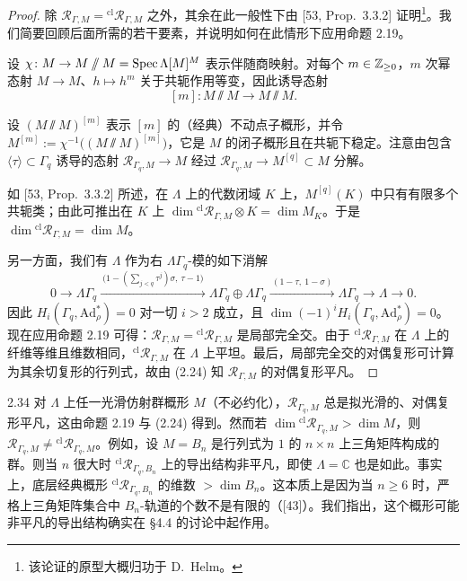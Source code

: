 \begin{proof}
除 $\mathcal R_{\Gamma,M} = {}^{\mathrm{cl}}\mathcal R_{\Gamma,M}$ 之外，其余在此一般性下由 [53, Prop.\ 3.3.2] 证明\footnote{该论证的原型大概归功于 D.\ Helm。}。我们简要回顾后面所需的若干要素，并说明如何在此情形下应用命题 2.19。

设 $\chi\colon M \to M\sslash M = \operatorname{Spec} \Lambda[M]^M$ 表示伴随商映射。对每个 $m \in \mathbb{Z}_{\ge 0}$，$m$ 次幂态射 $M \to M$、$h \mapsto h^m$ 关于共轭作用等变，因此诱导态射
\[
[m]\colon M\sslash M \to M\sslash M.
\]

设 $(M\sslash M)^{[m]}$ 表示 $[m]$ 的（经典）不动点子概形，并令 $M^{[m]} := \chi^{-1}\bigl((M\sslash M)^{[m]}\bigr)$，它是 $M$ 的闭子概形且在共轭下稳定。注意由包含 $\langle\tau\rangle \subset \Gamma_q$ 诱导的态射 $\mathcal R_{\Gamma_q,M} \to M$ 经过 $\mathcal R_{\Gamma_q,M} \to M^{[q]} \subset M$ 分解。

如 [53, Prop.\ 3.3.2] 所述，在 $\Lambda$ 上的代数闭域 $K$ 上，$M^{[q]}(K)$ 中只有有限多个共轭类；由此可推出在 $K$ 上 $\dim {}^{\mathrm{cl}}\mathcal R_{\Gamma,M}\otimes K = \dim M_K$。于是 $\dim {}^{\mathrm{cl}}\mathcal R_{\Gamma,M} = \dim M$。

另一方面，我们有 $\Lambda$ 作为右 $\Lambda\Gamma_q$-模的如下消解
\begin{equation}
\tag{2.24}
0 \to \Lambda\Gamma_q \xrightarrow{\ \bigl(1-(\sum_{j<q}\tau^{j})\sigma,\ \tau-1\bigr)\ } \Lambda\Gamma_q\oplus\Lambda\Gamma_q \xrightarrow{\ (1-\tau,\ 1-\sigma)\ } \Lambda\Gamma_q \to \Lambda \to 0 .
\end{equation}
因此 $H_i(\Gamma_q,\mathrm{Ad}^*_\rho) = 0$ 对一切 $i > 2$ 成立，且 $\dim(-1)^iH_i(\Gamma_q,\mathrm{Ad}^*_\rho) = 0$。现在应用命题 2.19 可得：$\mathcal R_{\Gamma,M} = {}^{\mathrm{cl}}\mathcal R_{\Gamma,M}$ 是局部完全交。由于 ${}^{\mathrm{cl}}\mathcal R_{\Gamma,M}$ 在 $\Lambda$ 上的纤维等维且维数相同，${}^{\mathrm{cl}}\mathcal R_{\Gamma,M}$ 在 $\Lambda$ 上平坦。最后，局部完全交的对偶复形可计算为其余切复形的行列式，故由 (2.24) 知 $\mathcal R_{\Gamma,M}$ 的对偶复形平凡。
\end{proof}

\begin{rem}{2.34}
对 $\Lambda$ 上任一光滑仿射群概形 $M$（不必约化），$\mathcal R_{\Gamma_q,M}$ 总是拟光滑的、对偶复形平凡，这由命题 2.19 与 (2.24) 得到。然而若 $\dim {}^{\mathrm{cl}}\mathcal R_{\Gamma_q,M} > \dim M$，则 $\mathcal R_{\Gamma_q,M} \neq {}^{\mathrm{cl}}\mathcal R_{\Gamma_q,M}$。例如，设 $M = B_n$ 是行列式为 $1$ 的 $n\times n$ 上三角矩阵构成的群。则当 $n$ 很大时 ${}^{\mathrm{cl}}\mathcal R_{\Gamma_q,B_n}$ 上的导出结构非平凡，即使 $\Lambda = \mathbb C$ 也是如此。事实上，底层经典概形 ${}^{\mathrm{cl}}\mathcal R_{\Gamma_q,B_n}$ 的维数 $> \dim B_n$。这本质上是因为当 $n \ge 6$ 时，严格上三角矩阵集合中 $B_n$-轨道的个数不是有限的（[43]）。我们指出，这个概形可能非平凡的导出结构确实在 §4.4 的讨论中起作用。
\label{rem:zhu2-2-34}
\end{rem}

